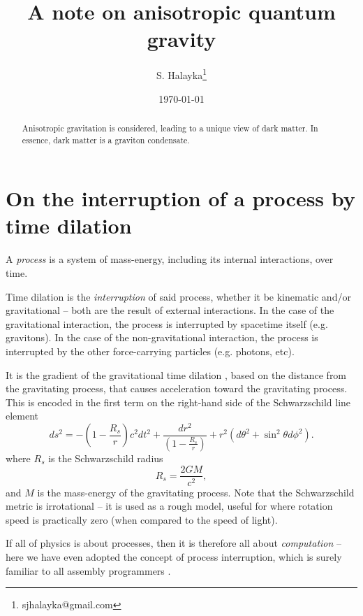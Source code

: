 \documentclass[12pt]{article}
\title{A note on anisotropic quantum gravity}
\author{S. Halayka\footnote{sjhalayka@gmail.com}}
\date{\today\;\currenttime}
\begin{document}
 
\maketitle

\begin{abstract}
Anisotropic gravitation is considered, leading to a unique view of dark matter.
In essence, dark matter is a graviton condensate.
\end{abstract}






\section{On the interruption of a process by time dilation}

A {\textit{process}} is a system of mass-energy, including its internal interactions, over time.

Time dilation is the {\textit{interruption}} of said process, whether it be kinematic and/or gravitational -- both are the result of external interactions.
In the case of the gravitational interaction, the process is interrupted by spacetime itself (e.g. gravitons).
In the case of the non-gravitational interaction, the process is interrupted by the other force-carrying particles (e.g. photons, etc).

It is the gradient of the gravitational time dilation \cite{misner}, based on the distance from the gravitating process, that causes acceleration toward the gravitating process.
This is encoded in the first term on the right-hand side of the Schwarzschild line element
\begin{equation}
ds^2 = -\left( 1 - \frac{R_s}{r} \right) c^2 dt^2 + \frac{dr^2}{\left( 1 - \frac{R_s}{r} \right)} + r^2 (d\theta^2 + \sin^2 \theta d\phi^2).
\end{equation}
where $R_s$ is the Schwarzschild radius
\begin{equation}
R_s = \frac{2GM}{c^2},
\end{equation}
and $M$ is the mass-energy of the gravitating process.
Note that the Schwarzschild metric is irrotational -- it is used as a rough model, useful for where rotation speed is practically zero (when compared to the speed of light).

If all of physics is about processes, then it is therefore all about {\textit{computation}} \cite{zuse, wolfram} -- here we have even adopted the concept of process interruption, which is surely familiar to all assembly programmers \cite{abrash}.
\end{document}
